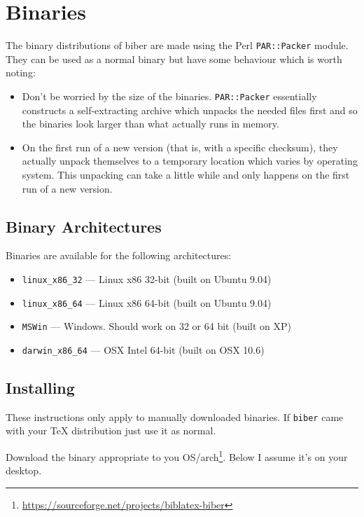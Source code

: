 \documentclass{ltxdockit}
\begin{document}
\section{Binaries}

The binary distributions of biber are made using the Perl \verb+PAR::Packer+
module. They can be used as a normal binary but have some behaviour which
is worth noting:

\begin{itemize}
\item Don't be worried by the size of the binaries. \verb+PAR::Packer+ essentially
  constructs a self-extracting archive which unpacks the needed files first
  and so the binaries look larger than what actually runs in memory.
\item On the first run of a new version (that is, with a specific checksum),
  they actually unpack themselves to a temporary location which varies by
  operating system. This unpacking can take a little while and only happens on
  the first run of a new version.
\end{itemize}

\subsection{Binary Architectures}

Binaries are available for the following architectures:

\begin{itemize}
\item \verb+linux_x86_32+ --- Linux x86 32-bit (built on Ubuntu 9.04)
\item \verb+linux_x86_64+ --- Linux x86 64-bit (built on Ubuntu 9.04)
\item \verb+MSWin+ --- Windows. Should work on 32 or 64 bit (built on XP)
\item \verb+darwin_x86_64+ --- OSX Intel 64-bit (built on OSX 10.6)
\end{itemize}


\subsection{Installing}

These instructions only apply to manually downloaded binaries. If
\verb+biber+ came with your TeX distribution just use it as normal.

Download the binary appropriate to you
OS/arch\footnote{\url{https://sourceforge.net/projects/biblatex-biber}}. Below
I assume it's on your desktop.
\end{document}
